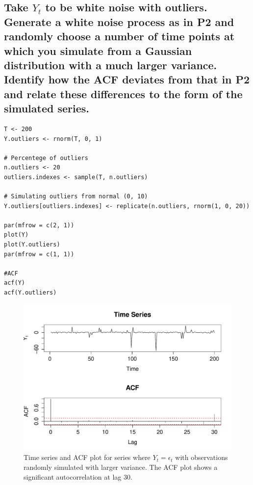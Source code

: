 \documentclass[10pt,a4paper]{article}
\let\Oldsubsection\subsection
\renewcommand{\subsection}{\FloatBarrier\Oldsubsection}
\begin{document}
\subsection{Take $Y_t$ to be white noise with outliers. Generate a white noise process as in P2 and randomly choose a number of time points at which you simulate from a Gaussian
distribution with a much larger variance. Identify how the ACF deviates from that
in P2 and relate these differences to the form of the simulated series.}

\begin{lstlisting}
T <- 200
Y.outliers <- rnorm(T, 0, 1)

# Percentege of outliers
n.outliers <- 20
outliers.indexes <- sample(T, n.outliers)

# Simulating outliers from normal (0, 10)
Y.outliers[outliers.indexes] <- replicate(n.outliers, rnorm(1, 0, 20))

par(mfrow = c(2, 1))  
plot(Y)
plot(Y.outliers)
par(mfrow = c(1, 1))

#ACF
acf(Y)
acf(Y.outliers)
\end{lstlisting}
\begin{figure}[ht]
\includegraphics[width=\linewidth]{plots/p3.pdf}
\caption{Time series and ACF plot for series where $Y_t = \epsilon_t$ with observations randomly simulated with larger variance. The ACF plot shows a significant autocorrelation at lag 30.}
\end{figure}
\end{document}
